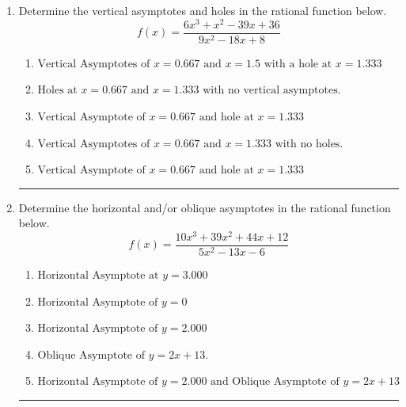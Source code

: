 \documentclass[14pt]{extbook}
\newcommand{\litem}[1]{\item#1\hspace*{-1cm}\rule{\textwidth}{0.4pt}}
\begin{document}
\begin{enumerate}
{\begin{enumerate}[label=\Alph*.]
\end{enumerate} }
\litem{
Determine the vertical asymptotes and holes in the rational function below.\[ f(x) = \frac{6x^{3} + x^{2} -39 x + 36}{9x^{2} -18 x + 8} \]\begin{enumerate}[label=\Alph*.]
\item \( \text{Vertical Asymptotes of } x = 0.667 \text{ and } x = 1.5 \text{ with a hole at } x = 1.333 \)
\item \( \text{Holes at } x = 0.667 \text{ and } x = 1.333 \text{ with no vertical asymptotes.} \)
\item \( \text{Vertical Asymptote of } x = 0.667 \text{ and hole at } x = 1.333 \)
\item \( \text{Vertical Asymptotes of } x = 0.667 \text{ and } x = 1.333 \text{ with no holes.} \)
\item \( \text{Vertical Asymptote of } x = 0.667 \text{ and hole at } x = 1.333 \)

\end{enumerate} }
\litem{
Determine the horizontal and/or oblique asymptotes in the rational function below.\[ f(x) = \frac{10x^{3} +39 x^{2} +44 x + 12}{5x^{2} -13 x -6} \]\begin{enumerate}[label=\Alph*.]
\item \( \text{Horizontal Asymptote at } y = 3.000 \)
\item \( \text{Horizontal Asymptote of } y = 0 \)
\item \( \text{Horizontal Asymptote of } y = 2.000  \)
\item \( \text{Oblique Asymptote of } y = 2x + 13. \)
\item \( \text{Horizontal Asymptote of } y = 2.000 \text{ and Oblique Asymptote of } y = 2x + 13 \)

\end{enumerate} }
\end{enumerate}
\end{document}
